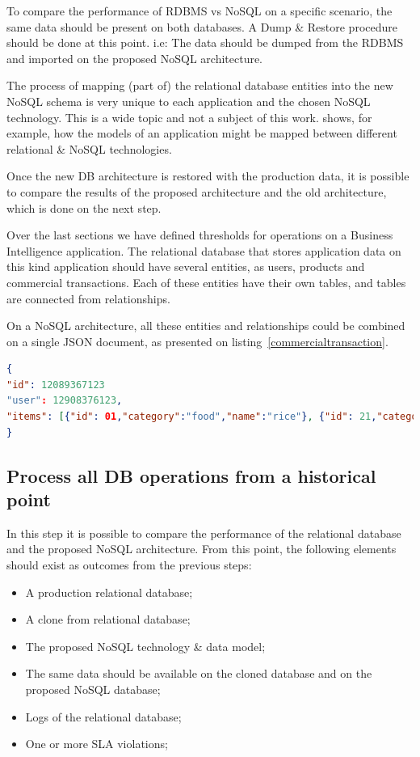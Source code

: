 To compare the performance of RDBMS vs NoSQL on a specific scenario, the same data should be present on both databases. A Dump \& Restore procedure should be done at this point. i.e: The data should be dumped from the RDBMS and imported on the proposed NoSQL architecture.

The process of mapping (part of) the relational database entities into the new NoSQL schema is very unique to each application and the chosen NoSQL technology. This is a wide topic and not a subject of this work. \cite{bahl2014mysql} shows, for example, how the models of an application might be mapped between different relational \& NoSQL technologies.

Once the new DB architecture is restored with the production data, it is possible to compare the results of the proposed architecture and the old architecture, which is done on the next step.

Over the last sections we have defined thresholds for operations on a Business Intelligence application. The relational database that stores application data on this kind application should have several entities, as users, products and commercial transactions. Each of these entities have their own tables, and tables are connected from relationships. 

On a NoSQL architecture, all these entities and relationships could be combined on a single JSON document, as presented on listing~\ref{commercialtransaction}. 

\begin{lstlisting}[language=json,firstnumber=1, caption=BI application commercial transaction represented as a single document., label=commercialtransaction]
{
"id": 12089367123
"user": 12908376123,
"items": [{"id": 01,"category":"food","name":"rice"}, {"id": 21,"category":"drinks","name":"soda"}]
}
\end{lstlisting}
\subsection{Process all DB operations from a historical point}

In this step it is possible to compare the performance of the relational database and the proposed NoSQL architecture. From this point, the following elements should exist as outcomes from the previous steps: 

\begin{itemize}
\item{A production relational database;}
\item{A clone from relational database;}
\item{The proposed NoSQL technology \& data model;}
\item{The same data should be available on the cloned database and on the proposed NoSQL database;}
\item{Logs of the relational database;}
\item{One or more SLA violations;}
\end{itemize}

